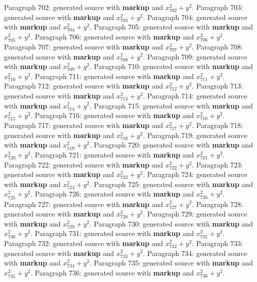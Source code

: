 \documentclass{article}
\begin{document}
Paragraph 702: generated source with \textbf{markup} and $x_{702}^2 + y^2$.
Paragraph 703: generated source with \textbf{markup} and $x_{703}^2 + y^2$.
Paragraph 704: generated source with \textbf{markup} and $x_{704}^2 + y^2$.
Paragraph 705: generated source with \textbf{markup} and $x_{705}^2 + y^2$.
Paragraph 706: generated source with \textbf{markup} and $x_{706}^2 + y^2$.
Paragraph 707: generated source with \textbf{markup} and $x_{707}^2 + y^2$.
Paragraph 708: generated source with \textbf{markup} and $x_{708}^2 + y^2$.
Paragraph 709: generated source with \textbf{markup} and $x_{709}^2 + y^2$.
Paragraph 710: generated source with \textbf{markup} and $x_{710}^2 + y^2$.
Paragraph 711: generated source with \textbf{markup} and $x_{711}^2 + y^2$.
Paragraph 712: generated source with \textbf{markup} and $x_{712}^2 + y^2$.
Paragraph 713: generated source with \textbf{markup} and $x_{713}^2 + y^2$.
Paragraph 714: generated source with \textbf{markup} and $x_{714}^2 + y^2$.
Paragraph 715: generated source with \textbf{markup} and $x_{715}^2 + y^2$.
Paragraph 716: generated source with \textbf{markup} and $x_{716}^2 + y^2$.
Paragraph 717: generated source with \textbf{markup} and $x_{717}^2 + y^2$.
Paragraph 718: generated source with \textbf{markup} and $x_{718}^2 + y^2$.
Paragraph 719: generated source with \textbf{markup} and $x_{719}^2 + y^2$.
Paragraph 720: generated source with \textbf{markup} and $x_{720}^2 + y^2$.
Paragraph 721: generated source with \textbf{markup} and $x_{721}^2 + y^2$.
Paragraph 722: generated source with \textbf{markup} and $x_{722}^2 + y^2$.
Paragraph 723: generated source with \textbf{markup} and $x_{723}^2 + y^2$.
Paragraph 724: generated source with \textbf{markup} and $x_{724}^2 + y^2$.
Paragraph 725: generated source with \textbf{markup} and $x_{725}^2 + y^2$.
Paragraph 726: generated source with \textbf{markup} and $x_{726}^2 + y^2$.
Paragraph 727: generated source with \textbf{markup} and $x_{727}^2 + y^2$.
Paragraph 728: generated source with \textbf{markup} and $x_{728}^2 + y^2$.
Paragraph 729: generated source with \textbf{markup} and $x_{729}^2 + y^2$.
Paragraph 730: generated source with \textbf{markup} and $x_{730}^2 + y^2$.
Paragraph 731: generated source with \textbf{markup} and $x_{731}^2 + y^2$.
Paragraph 732: generated source with \textbf{markup} and $x_{732}^2 + y^2$.
Paragraph 733: generated source with \textbf{markup} and $x_{733}^2 + y^2$.
Paragraph 734: generated source with \textbf{markup} and $x_{734}^2 + y^2$.
Paragraph 735: generated source with \textbf{markup} and $x_{735}^2 + y^2$.
Paragraph 736: generated source with \textbf{markup} and $x_{736}^2 + y^2$.
\end{document}
